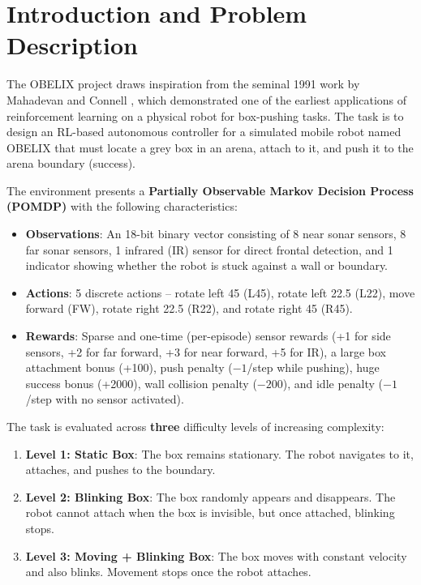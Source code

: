 \documentclass[10.5pt, oneside]{article}
\begin{document}
\section{Introduction and Problem Description}

The OBELIX project draws inspiration from the seminal 1991 work by Mahadevan and Connell \cite{mahadevan1992automatic}, which demonstrated one of the earliest applications of reinforcement learning on a physical robot for box-pushing tasks. The task is to design an RL-based autonomous controller for a simulated mobile robot named OBELIX that must locate a grey box in an arena, attach to it, and push it to the arena boundary (success).

The environment presents a \textbf{Partially Observable Markov Decision Process (POMDP)} with the following characteristics:

\begin{itemize}[nosep]
    \item \textbf{Observations}: An 18-bit binary vector consisting of 8 near sonar sensors, 8 far sonar sensors, 1 infrared (IR) sensor for direct frontal detection, and 1 indicator showing whether the robot is stuck against a wall or boundary.
    \item \textbf{Actions}: 5 discrete actions -- rotate left 45\textdegree{} (L45), rotate left 22.5\textdegree{} (L22), move forward (FW), rotate right 22.5\textdegree{} (R22), and rotate right 45\textdegree{} (R45).
    \item \textbf{Rewards}: Sparse and one-time (per-episode) sensor rewards (+1 for side sensors, +2 for far forward, +3 for near forward, +5 for IR), a large box attachment bonus (+100), push penalty ($-1$/step while pushing), huge success bonus (+2000), wall collision penalty ($-200$), and idle penalty ($-1$/step with no sensor activated).
\end{itemize}

The task is evaluated across \textbf{three }difficulty levels of increasing complexity:

\begin{enumerate}[nosep]
    \item \textbf{Level 1: Static Box}: The box remains stationary. The robot navigates to it, attaches, and pushes to the boundary.
    \item \textbf{Level 2: Blinking Box}: The box randomly appears and disappears. The robot cannot attach when the box is invisible, but once attached, blinking stops.
    \item \textbf{Level 3: Moving + Blinking Box}: The box moves with constant velocity and also blinks. Movement stops once the robot attaches.
\end{enumerate}
\end{document}
